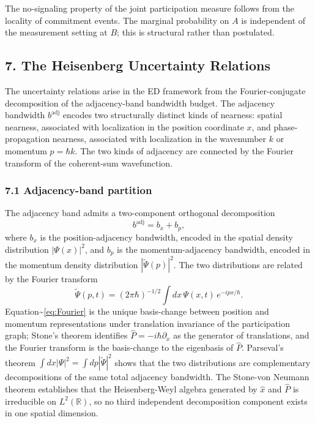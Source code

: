 \documentclass[
  11pt,
]{article}
\begin{document}
The no-signaling property of the joint participation measure follows
from the locality of commitment events. The marginal probability on
\(A\) is independent of the measurement setting at \(B\); this is
structural rather than postulated.

\subsection{7. The Heisenberg Uncertainty
Relations}\label{the-heisenberg-uncertainty-relations}

The uncertainty relations arise in the ED framework from the
Fourier-conjugate decomposition of the adjacency-band bandwidth budget.
The adjacency bandwidth \(b^{\mathrm{adj}}\) encodes two structurally
distinct kinds of nearness: spatial nearness, associated with
localization in the position coordinate \(x\), and phase-propagation
nearness, associated with localization in the wavenumber \(k\) or
momentum \(p = \hbar k\). The two kinds of adjacency are connected by
the Fourier transform of the coherent-sum wavefunction.

\subsubsection{7.1 Adjacency-band
partition}\label{adjacency-band-partition}

The adjacency band admits a two-component orthogonal decomposition
\begin{equation}
  b^{\mathrm{adj}} = b_x + b_p,
  \label{eq:adj_partition}
\end{equation} where \(b_x\) is the position-adjacency bandwidth,
encoded in the spatial density distribution \(|\Psi(x)|^2\), and \(b_p\)
is the momentum-adjacency bandwidth, encoded in the momentum density
distribution \(|\tilde\Psi(p)|^2\). The two distributions are related by
the Fourier transform \begin{equation}
  \tilde\Psi(p,t) = (2\pi\hbar)^{-1/2} \int dx \, \Psi(x,t) \, e^{-ipx/\hbar}.
  \label{eq:Fourier}
\end{equation} Equation\textasciitilde{}\eqref{eq:Fourier} is the unique
basis-change between position and momentum representations under
translation invariance of the participation graph; Stone's theorem
identifies \(\hat{P} = -i\hbar \partial_x\) as the generator of
translations, and the Fourier transform is the basis-change to the
eigenbasis of \(\hat{P}\). Parseval's theorem
\(\int dx |\Psi|^2 = \int dp |\tilde\Psi|^2\) shows that the two
distributions are complementary decompositions of the same total
adjacency bandwidth. The Stone-von Neumann theorem establishes that the
Heisenberg-Weyl algebra generated by \(\hat{x}\) and \(\hat{P}\) is
irreducible on \(L^2(\mathbb{R})\), so no third independent
decomposition component exists in one spatial dimension.
\end{document}
